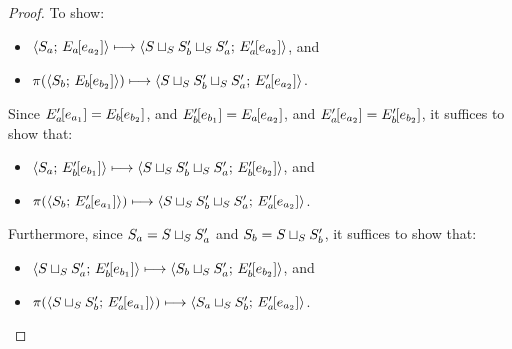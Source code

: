 \begin{proof}
  To show:
  \begin{itemize}
  \item $\langle S_a;\, E_a\hspace{-1mm}\left[e_{a_2}\right] \rangle \longmapsto
    \langle S \sqcup_{S} S'_b \sqcup_{S} S'_a;\, E'_a\hspace{-1mm}\left[e_{a_2}\right] \rangle$,
    and
  \item $\pi(\langle S_b;\, E_b\hspace{-1mm}\left[e_{b_2}\right] \rangle) \longmapsto
    \langle S \sqcup_{S} S'_b \sqcup_{S} S'_a;\, E'_a\hspace{-1mm}\left[e_{a_2}\right] \rangle$.
  \end{itemize}

  Since 
  $E'_a\hspace{-1mm}\left[e_{a_1}\right] = E_b\hspace{-1mm}\left[e_{b_2}\right]$, and
  $E'_b\hspace{-1mm}\left[e_{b_1}\right] = E_a\hspace{-1mm}\left[e_{a_2}\right]$, and
  $E'_a\hspace{-1mm}\left[e_{a_2}\right] =
  E'_b\hspace{-1mm}\left[e_{b_2}\right]$, it suffices to show that:

  \begin{itemize}
  \item $\langle S_a;\, E'_b\hspace{-1mm}\left[e_{b_1}\right] \rangle \longmapsto
    \langle S \sqcup_{S} S'_b \sqcup_{S} S'_a;\, E'_b\hspace{-1mm}\left[e_{b_2}\right] \rangle$,
    and
  \item $\pi(\langle S_b;\, E'_a\hspace{-1mm}\left[e_{a_1}\right] \rangle) \longmapsto
    \langle S \sqcup_{S} S'_b \sqcup_{S} S'_a;\, E'_a\hspace{-1mm}\left[e_{a_2}\right] \rangle$.
  \end{itemize}

  Furthermore, since $S_a = S \sqcup_{S} S'_a$ and $S_b =
  S \sqcup_{S} S'_b$, it suffices to show that:

  \begin{itemize}
  \item $\langle S \sqcup_{S} S'_a;\, E'_b\hspace{-1mm}\left[e_{b_1}\right] \rangle \longmapsto
    \langle S_b \sqcup_{S} S'_a;\, E'_b\hspace{-1mm}\left[e_{b_2}\right] \rangle$,
    and
  \item $\pi(\langle S \sqcup_{S} S'_b;\, E'_a\hspace{-1mm}\left[e_{a_1}\right] \rangle)
    \longmapsto
    \langle S_a \sqcup_{S} S'_b;\, E'_a\hspace{-1mm}\left[e_{a_2}\right] \rangle$.
  \end{itemize}



  
\end{proof}

